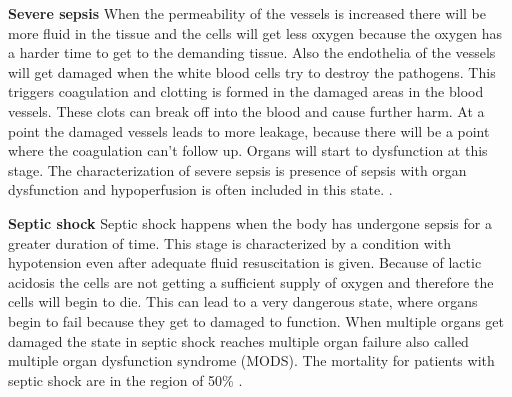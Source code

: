 \textbf{Severe sepsis}
When the permeability of the vessels is increased there will be more fluid in the tissue and the cells will get less oxygen because the oxygen has a harder time to get to the demanding tissue. Also the endothelia of the vessels will get damaged when the white blood cells try to destroy the pathogens. This triggers coagulation and clotting is formed in the damaged areas in the blood vessels. These clots can break off into the blood and cause further harm. At a point the damaged vessels leads to more leakage, because there will be a point where the coagulation can’t follow up. Organs will start to dysfunction at this stage. The characterization of severe sepsis is presence of sepsis with organ dysfunction and hypoperfusion is often included in this state. \cite{baudouin200,kanta2014}. 

\textbf{Septic shock}
Septic shock happens when the body has undergone sepsis for a greater duration of time. This stage is characterized by a condition with hypotension even after adequate fluid resuscitation is given. Because of lactic acidosis the cells are not getting a sufficient supply of oxygen and therefore the cells will begin to die. This can lead to a very dangerous state, where organs begin to fail because they get to damaged to function. When multiple organs get damaged the state in septic shock reaches multiple organ failure also called multiple organ dysfunction syndrome (MODS)\citep{baudouin200,kanta2014}. The mortality for patients with septic shock are in the region of 50\% \cite{baudouin200}. 

